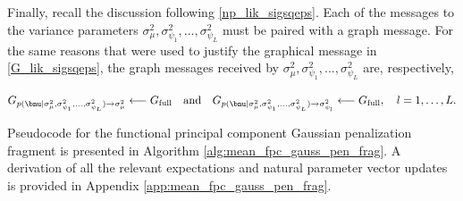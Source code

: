 \documentclass[12pt]{article}
\def\sigsqmu{\sigma^2_{\mu}}
\newcommand\sigsqpsi[1]{\sigma^2_{\psi_{#1}}}
\theoremstyle{plain}
\theoremstyle{definition}
\theoremstyle{remark}
\begin{document}
Finally, recall the discussion following \eqref{np_lik_sigsqeps}.
Each of the messages to the variance parameters $\sigsqmu,
\sigsqpsi{1}, \dots, \sigsqpsi{L}$ must be paired with a graph message. For the same reasons that were used to
justify the graphical message in \eqref{G_lik_sigsqeps}, the graph messages received by $\sigsqmu,
\sigsqpsi{1}, \dots, \sigsqpsi{L}$ are, respectively,

\begin{equation}
	G_{p (\bnu | \sigsqmu, \sigsqpsi{1}, \dots, \sigsqpsi{L}) \rightarrow \sigsqmu}
		\longleftarrow
			G_{\text{full}} \quad
	\text{and} \quad
	G_{p (\bnu | \sigsqmu, \sigsqpsi{1}, \dots, \sigsqpsi{L}) \rightarrow \sigsqpsi{l}}
		\longleftarrow
			G_{\text{full}}, \quad l = 1, \dots, L.
\label{G_pen}
\end{equation}

Pseudocode for the functional principal component Gaussian penalization fragment is presented in Algorithm
\ref{alg:mean_fpc_gauss_pen_frag}.
A derivation of all the relevant expectations and natural parameter vector updates is provided in Appendix
\ref{app:mean_fpc_gauss_pen_frag}.
\end{document}
